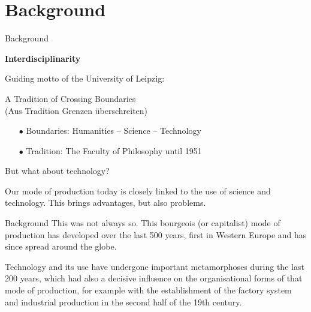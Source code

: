 \documentclass{beamer}
\title{Modelling Sustainable Systems\\ and Semantic Web\\[6pt] Introduction
  \vskip1em}
\subtitle{Lecture in the Module 10-202-2312\\ for Master Computer Science}
\author{Prof. Dr. Hans-Gert Gräbe\\
\url{http://www.informatik.uni-leipzig.de/~graebe}}
\date{April 2022}
\newcommand{\ueberschrift}[1]{\begin{center}\bf #1\end{center}}
\begin{document}
{
\begin{frame}
  \titlepage
\end{frame}}

\section{Background}
\begin{frame}{Background}

\ueberschrift{Interdisciplinarity}

Guiding motto of the University of Leipzig:
\begin{center}
  A Tradition of Crossing Boundaries\\ (Aus Tradition Grenzen überschreiten) 
\end{center}

\begin{itemize}
\item[$\bullet$]  Boundaries: Humanities -- Science -- Technology
\item[$\bullet$]  Tradition: The Faculty of Philosophy until 1951
\end{itemize}

But what about technology?

Our mode of production today is closely linked to the use of science and
technology. This brings advantages, but also problems.
\end{frame}

\begin{frame}{Background}
This was not always so. This bourgeois (or capitalist) mode of production has
developed over the last 500 years, first in Western Europe and has since
spread around the globe.

Technology and its use have undergone important metamorphoses during the last
200 years, which had also a decisive influence on the organisational forms of
that mode of production, for example with the establishment of the factory
system and industrial production in the second half of the 19th century.
\end{frame}
\end{document}
